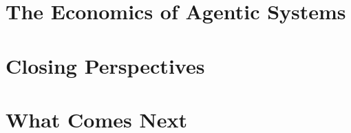 \documentclass[
  11pt,
  twoside,
  openright
]{book}
\begin{document}
\chapter{The Economics of Agentic Systems}
\label{ch:economics}

\chapter{Closing Perspectives}
\label{ch:closing-perspectives}

\chapter{What Comes Next}
\label{ch:what-comes-next}

\backmatter

\printindex
\end{document}
